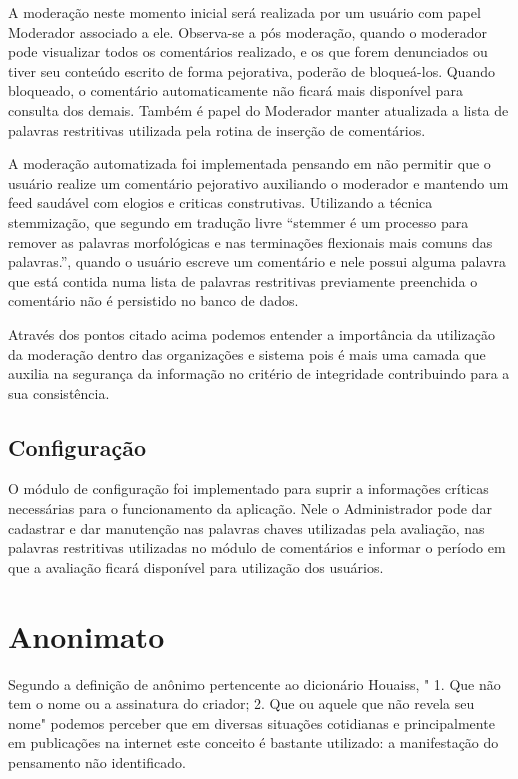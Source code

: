 \documentclass[12pt, a4paper]{report}
\begin{document}
A moderação neste momento inicial será realizada por um usuário com papel Moderador associado a ele. Observa-se a pós moderação, quando o moderador pode visualizar todos os comentários realizado, e os que forem denunciados ou tiver seu conteúdo escrito de forma pejorativa, poderão de bloqueá-los. Quando bloqueado, o comentário automaticamente não ficará mais disponível para consulta dos demais. Também é papel do Moderador manter atualizada a lista de palavras restritivas utilizada pela rotina de inserção de comentários. 


A moderação automatizada foi implementada pensando em não permitir que o usuário realize um comentário pejorativo auxiliando o moderador e mantendo um feed saudável com elogios e criticas construtivas. Utilizando a técnica stemmização, que segundo \cite{porter1980} em tradução livre “stemmer é um processo para remover as palavras morfológicas e nas terminações flexionais mais comuns das palavras.”, quando o usuário escreve um comentário e nele possui alguma palavra que está contida numa lista de palavras restritivas previamente preenchida o comentário não é persistido no banco de dados.  

Através dos pontos citado acima podemos entender a importância da utilização da moderação dentro das organizações e sistema pois é  mais uma camada que auxilia na segurança da informação no critério de integridade contribuindo para a sua consistência.

\subsection{Configuração}
O módulo de configuração foi implementado para suprir a  informações críticas necessárias para o funcionamento da aplicação. Nele o Administrador pode dar cadastrar e dar manutenção nas palavras chaves utilizadas pela avaliação, nas palavras restritivas utilizadas no módulo de comentários e informar o período em que a avaliação ficará disponível para utilização dos usuários.

\section{ Anonimato}
%
Segundo a definição de anônimo pertencente ao dicionário Houaiss, " 1. Que não tem o nome ou a assinatura do criador; 2. Que ou aquele que não revela seu nome" \cite[p. 7]{houasis2001} podemos perceber que em diversas situações cotidianas e principalmente em publicações na internet este conceito é bastante utilizado: a manifestação do pensamento não identificado.
\end{document}

